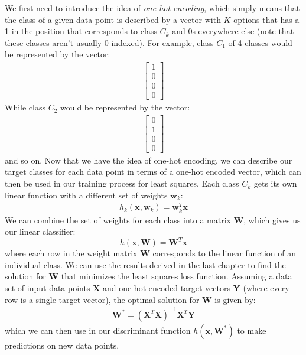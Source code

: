 We first need to introduce the idea of \textit{one-hot encoding}, which simply means that the class of a given data point is described by a vector with $K$ options that has a 1 in the position that corresponds to class $C_{k}$ and 0s everywhere else (note that these classes aren't usually 0-indexed). For example, class $C_{1}$ of 4 classes would be represented by the vector:
\begin{align}
    \begin{bmatrix}
    	1 \\
        0 \\
        0 \\
        0
    \end{bmatrix}
\end{align}
While class $C_{2}$ would be represented by the vector:
\begin{align}
    \begin{bmatrix}
    	0 \\
        1 \\
        0 \\
        0
    \end{bmatrix}
\end{align}
and so on. Now that we have the idea of one-hot encoding, we can describe our target classes for each data point in terms of a one-hot encoded vector, which can then be used in our training process for least squares. \newline \newline
Each class $C_{k}$ gets its own linear function with a different set of weights $\textbf{w}_{k}$:
\begin{align*}
	h_{k}(\textbf{x}, \textbf{w}_{k}) = \textbf{w}_{k}^{T}\textbf{x}
\end{align*}
We can combine the set of weights for each class into a matrix $\textbf{W}$, which gives us our linear classifier:
\begin{equation}
	h(\textbf{x}, \textbf{W}) = \textbf{W}^{T}\textbf{x}
\end{equation}
where each row in the weight matrix \textbf{W} corresponds to the linear function of an individual class. We can use the results derived in the last chapter to find the solution for \textbf{W} that minimizes the least squares loss function. Assuming a data set of input data points $\textbf{X}$ and one-hot encoded target vectors \textbf{Y} (where every row is a single target vector), the optimal solution for \textbf{W} is given by:
\begin{align*}
	\textbf{W}^{*} = (\textbf{X}^{T}\textbf{X})^{-1}\textbf{X}^{T}\textbf{Y}
\end{align*}
which we can then use in our discriminant function $h(\textbf{x}, \textbf{W}^{*})$ to make predictions on new data points.

